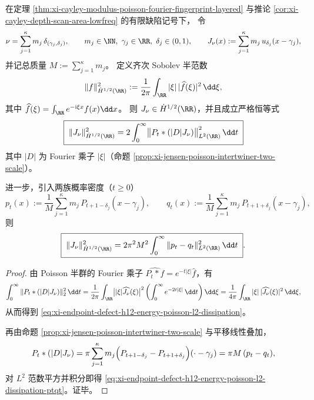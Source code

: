 \begin{theorem}\label{thm:xi-endpoint-defect-h12-energy-poisson-l2-dissipation}
在定理 \ref{thm:xi-cayley-modulus-poisson-fourier-fingerprint-layered} 与推论 \ref{cor:xi-cayley-depth-scan-area-lowfreq} 的有限缺陷记号下，
令
\[
\nu=\sum_{j=1}^{\kappa}m_j\,\delta_{(\gamma_j,\delta_j)},\qquad
m_j\in\NN,\ \gamma_j\in\RR,\ \delta_j\in(0,1),
\qquad
J_\nu(x):=\sum_{j=1}^{\kappa}m_j\,u_{\delta_j}(x-\gamma_j),
\]
并记总质量 \(M:=\sum_{j=1}^{\kappa}m_j\)。
定义齐次 Sobolev 半范数
\[
\|f\|_{\dot H^{1/2}(\RR)}^2:=\frac{1}{2\pi}\int_{\RR}|\xi|\,|\widehat f(\xi)|^2\,\dd\xi,
\]
其中 \(\widehat f(\xi)=\int_{\RR}e^{-\mathrm{i}\xi x}f(x)\dd x\)。
则 \(J_\nu\in\dot H^{1/2}(\RR)\)，并且成立严格恒等式
\begin{equation}\label{eq:xi-endpoint-defect-h12-energy-poisson-l2-dissipation}
\boxed{\;
\|J_\nu\|_{\dot H^{1/2}(\RR)}^2
=2\int_{0}^{\infty}\bigl\|P_t*(|D|J_\nu)\bigr\|_{L^2(\RR)}^2\,\dd t\;}
\end{equation}
其中 \(|D|\) 为 Fourier 乘子 \(|\xi|\)（命题 \ref{prop:xi-jensen-poisson-intertwiner-two-scale}）。
\par
进一步，引入两族概率密度（\(t\ge0\)）
\[
p_t(x):=\frac{1}{M}\sum_{j=1}^{\kappa}m_j\,P_{t+1-\delta_j}(x-\gamma_j),
\qquad
q_t(x):=\frac{1}{M}\sum_{j=1}^{\kappa}m_j\,P_{t+1+\delta_j}(x-\gamma_j),
\]
则
\begin{equation}\label{eq:xi-endpoint-defect-h12-energy-poisson-l2-dissipation-ptqt}
\boxed{\;
\|J_\nu\|_{\dot H^{1/2}(\RR)}^2
=2\pi^2M^2\int_0^\infty\|p_t-q_t\|_{L^2(\RR)}^2\,\dd t\; }.
\end{equation}
\end{theorem}
\begin{proof}
由 Poisson 半群的 Fourier 乘子 \(\widehat{P_t*f}=e^{-t|\xi|}\widehat f\)，有
\[
\int_0^\infty\|P_t*(|D|J_\nu)\|_2^2\,\dd t
=\frac{1}{2\pi}\int_{\RR}\bigl||\xi|\widehat{J_\nu}(\xi)\bigr|^2
\left(\int_0^\infty e^{-2t|\xi|}\,\dd t\right)\dd\xi
=\frac{1}{4\pi}\int_{\RR}|\xi|\,|\widehat{J_\nu}(\xi)|^2\,\dd\xi,
\]
从而得到 \eqref{eq:xi-endpoint-defect-h12-energy-poisson-l2-dissipation}。
\par
再由命题 \ref{prop:xi-jensen-poisson-intertwiner-two-scale} 与平移线性叠加，
\[
P_t*(|D|J_\nu)
=\pi\sum_{j=1}^{\kappa}m_j\Bigl(P_{t+1-\delta_j}-P_{t+1+\delta_j}\Bigr)(\cdot-\gamma_j)
=\pi M\,(p_t-q_t),
\]
对 \(L^2\) 范数平方并积分即得 \eqref{eq:xi-endpoint-defect-h12-energy-poisson-l2-dissipation-ptqt}。证毕。
\end{proof}

